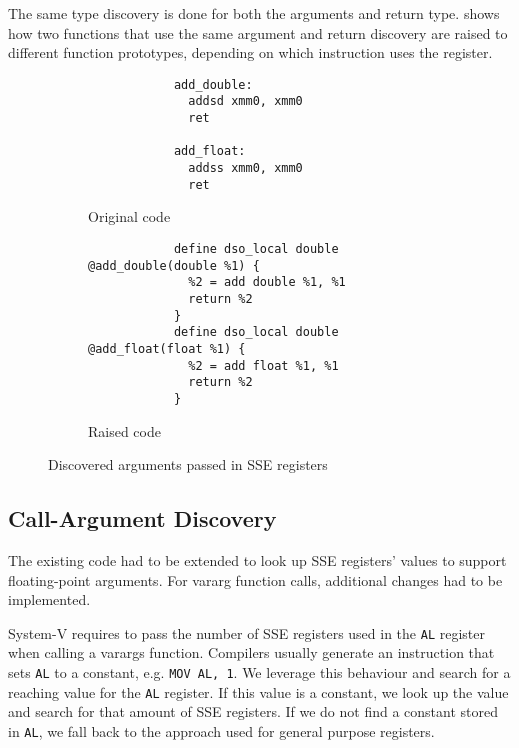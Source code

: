 The same type discovery is done for both the arguments and return type.
 shows how two functions that use the same argument and return discovery are raised to different function prototypes, depending on which instruction uses the register.

\begin{figure}[htpb]
    \centering
    \begin{subfigure}[t]{.3\textwidth}
        \begin{lstlisting}
            add_double:
              addsd xmm0, xmm0
              ret

            add_float:
              addss xmm0, xmm0
              ret
        \end{lstlisting}
        \caption{Original code}
    \end{subfigure}
    \hfill%
    \begin{subfigure}[t]{.65\textwidth}
        \begin{lstlisting}
            define dso_local double @add_double(double %1) {
              %2 = add double %1, %1
              return %2
            }
            define dso_local double @add_float(float %1) {
              %2 = add float %1, %1
              return %2
            }
        \end{lstlisting}
        \caption{Raised code}
    \end{subfigure}
    \caption{Discovered arguments passed in SSE registers}
    \label{fig:raised-code-float-args}
\end{figure}

\subsection{Call-Argument Discovery}\label{subsec:call-argument-discovery}

The existing code had to be extended to look up SSE registers' values to support floating-point arguments.
For vararg function calls, additional changes had to be implemented.

System-V requires to pass the number of SSE registers used in the \texttt{AL} register when calling a varargs function.
Compilers usually generate an instruction that sets \texttt{AL} to a constant, e.g. \texttt{MOV AL, 1}.
We leverage this behaviour and search for a reaching value for the \texttt{AL} register.
If this value is a constant, we look up the value and search for that amount of SSE registers.
If we do not find a constant stored in \texttt{AL}, we fall back to the approach used for general purpose registers.

